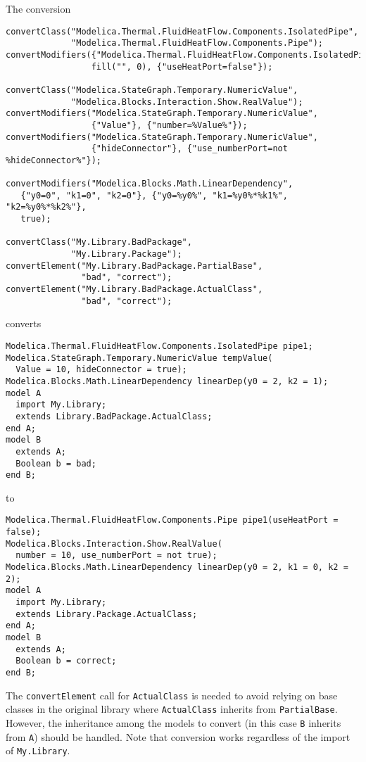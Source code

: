 \begin{example}
The conversion
\begin{lstlisting}[language=modelica]
convertClass("Modelica.Thermal.FluidHeatFlow.Components.IsolatedPipe",
             "Modelica.Thermal.FluidHeatFlow.Components.Pipe");
convertModifiers({"Modelica.Thermal.FluidHeatFlow.Components.IsolatedPipe"},
                 fill("", 0), {"useHeatPort=false"});

convertClass("Modelica.StateGraph.Temporary.NumericValue",
             "Modelica.Blocks.Interaction.Show.RealValue");
convertModifiers("Modelica.StateGraph.Temporary.NumericValue",
                 {"Value"}, {"number=%Value%"});
convertModifiers("Modelica.StateGraph.Temporary.NumericValue",
                 {"hideConnector"}, {"use_numberPort=not %hideConnector%"});

convertModifiers("Modelica.Blocks.Math.LinearDependency",
   {"y0=0", "k1=0", "k2=0"}, {"y0=%y0%", "k1=%y0%*%k1%", "k2=%y0%*%k2%"},
   true);

convertClass("My.Library.BadPackage",
             "My.Library.Package");
convertElement("My.Library.BadPackage.PartialBase",
               "bad", "correct");
convertElement("My.Library.BadPackage.ActualClass",
               "bad", "correct");
\end{lstlisting}
converts
\begin{lstlisting}[language=modelica]
Modelica.Thermal.FluidHeatFlow.Components.IsolatedPipe pipe1;
Modelica.StateGraph.Temporary.NumericValue tempValue(
  Value = 10, hideConnector = true);
Modelica.Blocks.Math.LinearDependency linearDep(y0 = 2, k2 = 1);
model A
  import My.Library;
  extends Library.BadPackage.ActualClass;
end A;
model B
  extends A;
  Boolean b = bad;
end B;
\end{lstlisting}
to
\begin{lstlisting}[language=modelica]
Modelica.Thermal.FluidHeatFlow.Components.Pipe pipe1(useHeatPort = false);
Modelica.Blocks.Interaction.Show.RealValue(
  number = 10, use_numberPort = not true);
Modelica.Blocks.Math.LinearDependency linearDep(y0 = 2, k1 = 0, k2 = 2);
model A
  import My.Library;
  extends Library.Package.ActualClass;
end A;
model B
  extends A;
  Boolean b = correct;
end B;
\end{lstlisting}
The \lstinline!convertElement! call for \lstinline!ActualClass! is needed to avoid relying on base classes in the original library where \lstinline!ActualClass! inherits from \lstinline!PartialBase!.
However, the inheritance among the models to convert (in this case \lstinline!B! inherits from \lstinline!A!) should be handled.
Note that conversion works regardless of the import of \lstinline!My.Library!.
\end{example}

